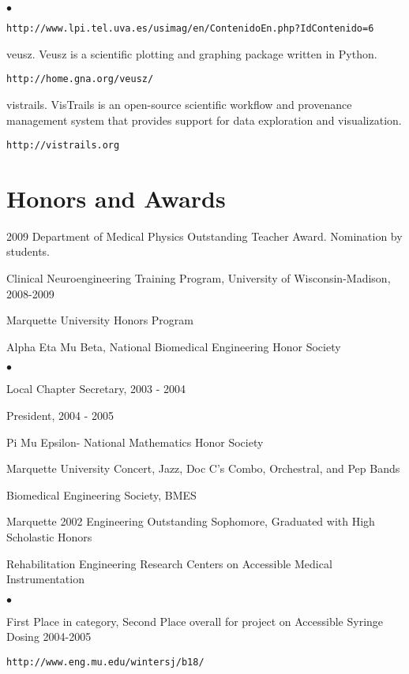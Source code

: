 \documentclass[margin,line]{res}
\newenvironment{list2}{
  \begin{list}{$\bullet$}{%
      \setlength{\itemsep}{0in}
      \setlength{\parsep}{0in} \setlength{\parskip}{0in}
      \setlength{\topsep}{0in} \setlength{\partopsep}{0in} 
      \setlength{\leftmargin}{0.2in}}}{\end{list}}
\begin{document}
\begin{resume}
\begin{list2}
  \begin{verbatim}http://www.lpi.tel.uva.es/usimag/en/ContenidoEn.php?IdContenido=6\end{verbatim}
\item veusz.  Veusz is a scientific plotting and graphing package written in
  Python.  \begin{verbatim}http://home.gna.org/veusz/\end{verbatim}
\item vistrails.  VisTrails is an open-source scientific workflow and provenance
  management system that provides support for data exploration and visualization.
  \begin{verbatim}http://vistrails.org\end{verbatim}
\end{list2}

\section{\sc Honors and Awards} 

2009 Department of Medical Physics Outstanding Teacher Award.  Nomination by students.

Clinical Neuroengineering Training Program, University of Wisconsin-Madison, 2008-2009

Marquette University Honors Program

Alpha Eta Mu Beta, National Biomedical Engineering Honor Society
\begin{list2}
 \item Local Chapter Secretary, 2003 - 2004
 \item President, 2004 - 2005
\end{list2}
 
Pi Mu Epsilon- National Mathematics Honor Society

Marquette University Concert, Jazz, Doc C's Combo, Orchestral, and Pep Bands

Biomedical Engineering Society, BMES

Marquette 2002 Engineering Outstanding Sophomore, Graduated with High Scholastic Honors

Rehabilitation Engineering Research Centers on Accessible Medical Instrumentation
\begin{list2}
 \item First Place in category, Second Place overall for project on Accessible Syringe Dosing 2004-2005
 \item \begin{verbatim}http://www.eng.mu.edu/wintersj/b18/\end{verbatim}
\end{list2}
%




\end{resume}
\end{document}
